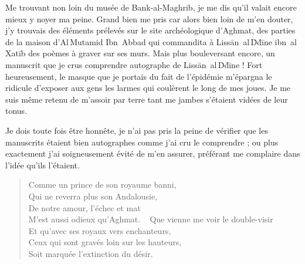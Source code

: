 \begin{prose}
Me trouvant non loin du musée de Bank-al-Maghrib, je me dis qu’il valait encore mieux y noyer ma peine. Grand bien me pris car alors  bien loin de m’en douter, j’y trouvais des éléments prélevés sur le site archéologique d’Aghmat, des parties de la maison d’Al\,Mutamid Ibn~Abbad qui commandita à Lissān~al\,Ḋḋīne ibn~al\,Xatīb des poèmes à graver sur ses murs. Mais plus bouleversant encore, un manuscrit que je crus comprendre autographe de Lissān~al\,Ḋḋīne ! Fort heureusement, le masque que je portais du fait de l’épidémie m’épargna le ridicule d’exposer aux gens les larmes qui coulèrent le long de mes joues. Je me suis même retenu de m’assoir par terre tant me jambes s’étaient vidées de leur tonus.

Je dois toute fois être honnête, je n’ai pas pris la peine de vérifier que les manuscrits étaient bien autographes comme j’ai cru le comprendre ; ou plus exactement j’ai soigneusement évité de m’en assurer, préférant me complaire dans l’idée qu’ils l’étaient.
\end{prose}

\begin{verse}
Comme un prince de son royaume banni,\\
Qui ne reverra plus  son Andalousie,\\
De notre amour, l’échec et mat\\
M’est aussi odieux qu’Aghmat.
~
Que vienne me voir le double-visir\\
Et qu’avec ses royaux vers enchanteurs,\\
Ceux qui sont gravés loin sur les hauteurs,\\
Soit marquée l’extinction du désir.
\end{verse}

